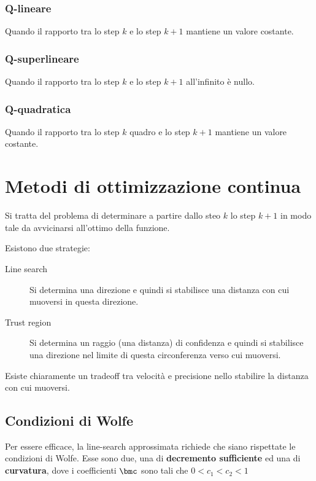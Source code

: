 \documentclass[\main/main.tex]{subfiles}
\begin{document}
\subsection{Q-lineare}
Quando il rapporto tra lo step \(k\) e lo step \(k+1\) mantiene un valore costante.

\subsection{Q-superlineare}
Quando il rapporto tra lo step \(k\) e lo step \(k+1\) all'infinito è nullo.

\subsection{Q-quadratica}
Quando il rapporto tra lo step \(k\) quadro e lo step \(k+1\) mantiene un valore costante.

\chapter{Metodi di ottimizzazione continua}
Si tratta del problema di determinare a partire dallo steo \(k\) lo step \(k+1\) in modo tale da avvicinarsi all'ottimo della funzione.

Esistono due strategie:

\begin{description}
    \item[Line search] Si determina una direzione e quindi si stabilisce una distanza con cui muoversi in questa direzione.
    \item[Trust region] Si determina un raggio (una distanza) di confidenza e quindi si stabilisce una direzione nel limite di questa circonferenza verso cui muoversi.
\end{description}

Esiste chiaramente un tradeoff tra velocità e precisione nello stabilire la distanza con cui muoversi.

\section{Condizioni di Wolfe}
Per essere efficace, la line-search approssimata richiede che siano rispettate le condizioni di Wolfe. Esse sono due, una di \textbf{decremento sufficiente} ed una di \textbf{curvatura}, dove i coefficienti \(\bmc \) sono tali che \(0<c_1<c_2<1\)
\end{document}
